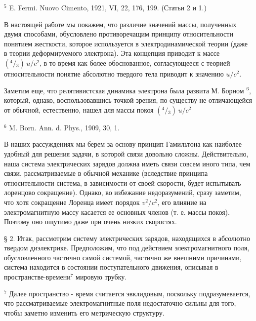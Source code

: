 \documentclass[11pt]{article}
\begin{document}
    \(^5\) E. Fermi. Nuovo Cimento, 1921, VI, 22, 176, 199. (Статьи 2 и 1.)

    В настоящей работе мы покажем, что различие значений массы, полученных
двумя способами, обусловлено противоречащим принципу относительности
понятием жесткости, которое используется в электродинамической теории
(даже в теории деформируемого электрона). Эта концепция приводит к массе
\(\left({}^{4} \big /{}_{3}\right) \, u/c^2\), в то время как более
обоснованное, согласующееся с теорией относительности понятие абсолютно
твердого тела приводит к значению \(u/c^2\).

    Заметим еще, что релятивистская динамика электрона была развита М.
Борном \(^6\), который, однако, воспользовавшись точкой зрения, по
существу не отличающейся от обычной, естественно, нашел для массы покоя
\(\left({}^{4} \big /{}_{3}\right) \, u/c^2\)

    \(^6\) M. Born. Ann. d. Phys., 1909, 30, 1.

    В наших рассуждениях мы берем за основу принцип Гамильтона как наиболее
удобный для решения задачи, в которой связи довольно сложны.
Действительно, наша система электрических зарядов должна иметь связи
совсем иного типа, чем связи, рассматриваемые в обычной механике
(вследствие принципа относительности система, в зависимости от своей
скорости, будет испытывать лоренцово сокращение). Однако, во избежание
недоразумений, сразу заметим, что хотя сокращение Лоренца имеет порядок
\({v^2} \big /{c^2}\), его влияние на электромагнитную массу касается ее
основных членов (т. е. массы покоя). Поэтому оно ощутимо даже при очень
низких скоростях.

    § 2. Итак, рассмотрим систему электрических зарядов, находящихся в
абсолютно твердом диэлектрике. Предположим, что под действием
электромагнитного поля, обусловленного частично самой системой, частично
же внешними причинами, система находится в состоянии поступательного
движения, описывая в пространстве-времени\(^7\) мировую трубку.

    \(^7\) Далее пространство - время считается эвклидовым, поскольку
подразумевается, что рассматриваемые электромагнитные поля недостаточно
сильны для того, чтобы заметно изменить его метрическую структуру.
\end{document}
